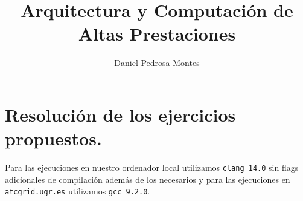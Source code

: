 \documentclass[10pt, a4paper]{aqademic}
\author{Daniel Pedrosa Montes}
\title{Arquitectura y Computación de Altas Prestaciones}
\begin{document}
\AqMaketitle[%
	cover    = identidad_ugr,
    subtitle = Manejo de MPI,
    url      = https://github.com/moshidev,
    date     = marzo del 2023 
]

\tableofcontents

\chapter{Resolución de los ejercicios propuestos.}
    Para las ejecuciones en nuestro ordenador local utilizamos \texttt{clang 14.0} sin flags
    adicionales de compilación además de los necesarios y para las ejecuciones en \texttt{atcgrid.ugr.es}
    utilizamos \texttt{gcc 9.2.0}.

    
    \pagebreak
    
    \pagebreak
    



\end{document}
